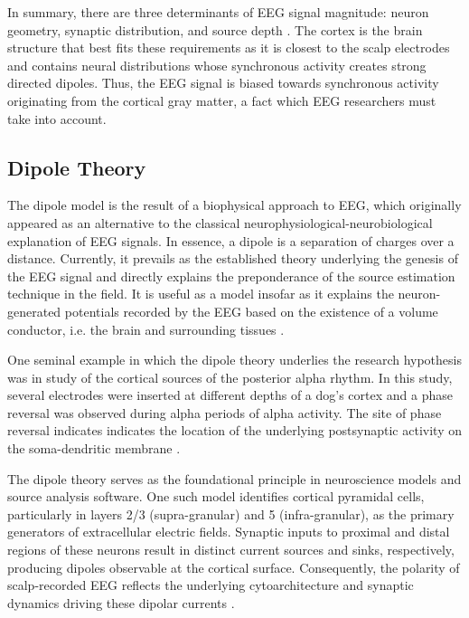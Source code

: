 In summary, there are three determinants of EEG signal magnitude: neuron geometry, synaptic distribution, and source depth \cite{nunezElectricFieldsBrain2006}. The cortex is the brain structure that best fits these requirements as it is closest to the scalp electrodes and contains neural distributions whose synchronous activity creates strong directed dipoles. Thus, the EEG signal is biased towards synchronous activity originating from the cortical gray matter, a fact which EEG researchers must take into account.


\subsection{Dipole Theory}

The dipole model is the result of a biophysical approach to EEG, which originally appeared as an alternative to the classical neurophysiological-neurobiological explanation of EEG signals. In essence, a dipole is a separation of charges over a distance. Currently, it prevails as the established theory underlying the genesis of the EEG signal and directly explains the preponderance of the source estimation technique in the field. It is useful as a model insofar as it explains the neuron-generated potentials recorded by the EEG based on the existence of a volume conductor, i.e. the brain and surrounding tissues \cite{niedermeyerDipoleTheoryElectroencephalography1996}.

One seminal example in which the dipole theory underlies the research hypothesis was in study of the cortical sources of the posterior alpha rhythm. In this study, several electrodes were inserted at different depths of a dog's cortex and a phase reversal was observed during alpha periods of alpha activity. The site of phase reversal indicates indicates the location of the underlying postsynaptic activity on the soma-dendritic membrane \cite{lopesdasilvaCorticalSourceAlpha1977}.

The dipole theory serves as the foundational principle in neuroscience models and source analysis software. One such model identifies cortical pyramidal cells, particularly in layers 2/3 (supra-granular) and 5 (infra-granular), as the primary generators of extracellular electric fields. Synaptic inputs to proximal and distal regions of these neurons result in distinct current sources and sinks, respectively, producing dipoles observable at the cortical surface. Consequently, the polarity of scalp-recorded EEG reflects the underlying cytoarchitecture and synaptic dynamics driving these dipolar currents \cite{neymotinHumanNeocorticalNeurosolver2020}.

